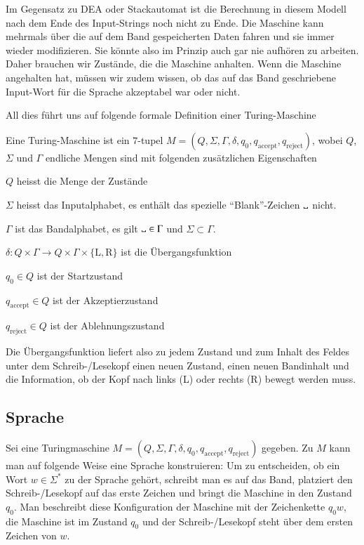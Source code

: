 Im Gegensatz zu DEA oder Stackautomat ist die Berechnung in diesem
Modell nach dem Ende des Input-Strings noch nicht zu Ende. Die Maschine
kann mehrmals über die auf dem Band gespeicherten Daten fahren und
sie immer wieder modifizieren. Sie könnte also im Prinzip auch
gar nie aufhören zu arbeiten. Daher brauchen wir Zustände, die
die Maschine anhalten. Wenn die Maschine angehalten hat, müssen wir
zudem wissen, ob das auf das Band geschriebene Input-Wort für die
Sprache akzeptabel war oder nicht.

All dies führt uns auf folgende formale Definition einer Turing-Maschine
\begin{definition}
Eine Turing-Maschine ist ein $7$-tupel
$M=(Q,\Sigma,\Gamma,\delta,q_0,q_{\text{accept}},q_{\text{reject}})$,
wobei $Q$, $\Sigma$ und $\Gamma$ endliche Mengen sind mit folgenden
zusätzlichen Eigenschaften
\begin{compactenum}
\item $Q$ heisst die Menge der Zustände
\item $\Sigma$ heisst das Inputalphabet, es enthält das spezielle
``Blank''-Zeichen $\blank$ nicht.
\item $\Gamma$ ist das Bandalphabet, es gilt $\blank\in\Gamma$ und
$\Sigma\subset\Gamma$.
\item $\delta\colon Q\times \Gamma\to Q\times\Gamma\times\{\text{L},\text{R}\}$
ist die Übergangsfunktion
\item $q_0\in Q$ ist der Startzustand
\item $q_{\text{accept}}\in Q$ ist der Akzeptierzustand
\item $q_{\text{reject}}\in Q$ ist der Ablehnungszustand
\end{compactenum}
\end{definition}
Die Übergangsfunktion liefert also zu jedem Zustand und zum
Inhalt des Feldes unter dem Schreib-/Lesekopf einen neuen
Zustand, einen neuen Bandinhalt und die Information, ob
der Kopf nach links (L) oder rechts (R) bewegt werden muss.

\subsection{Sprache}
Sei eine Turingmaschine
$M=(Q,\Sigma,\Gamma,\delta,q_0,q_{\text{accept}},q_{\text{reject}})$
gegeben.
Zu $M$ kann man auf folgende Weise eine Sprache konstruieren:
Um zu entscheiden, ob ein Wort $w\in\Sigma^*$
zu der Sprache gehört,
schreibt man es auf das Band, platziert den Schreib-/Lesekopf auf
das erste Zeichen und bringt die Maschine in den Zustand $q_0$.
Man beschreibt diese Konfiguration der Maschine mit der Zeichenkette
$q_0w$, die Maschine ist im Zustand $q_0$ und der Schreib-/Lesekopf
steht über dem ersten Zeichen von $w$.

